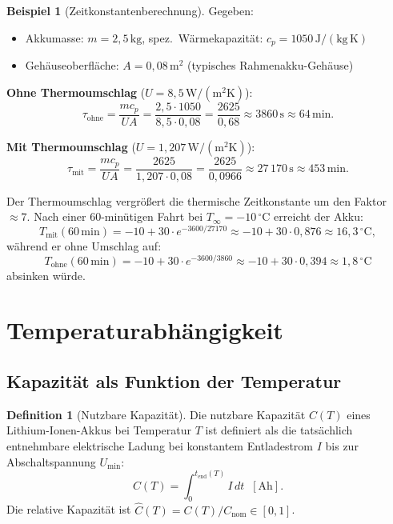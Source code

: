 ﻿\documentclass[a4paper,12pt]{article}
\theoremstyle{definition}
\newtheorem{definition}{Definition}
\newtheorem{beispiel}{Beispiel}
\begin{document}
\begin{beispiel}[Zeitkonstantenberechnung]
Gegeben:
\begin{itemize}
  \item Akkumasse: $m = 2{,}5\,\mathrm{kg}$, spez.\ W\"armekapazit\"at: $c_p = 1050\,\mathrm{J/(kg\,K)}$
  \item Geh\"auseoberfl\"ache: $A = 0{,}08\,\mathrm{m^2}$ (typisches Rahmenakku-Geh\"ause)
\end{itemize}

\textbf{Ohne Thermoumschlag} ($U = 8{,}5\,\mathrm{W/(m^2 K)}$):
\[
  \tau_\mathrm{ohne} = \frac{m c_p}{U A} = \frac{2{,}5 \cdot 1050}{8{,}5 \cdot 0{,}08} = \frac{2625}{0{,}68} \approx 3860\,\mathrm{s} \approx 64\,\mathrm{min}.
\]

\textbf{Mit Thermoumschlag} ($U = 1{,}207\,\mathrm{W/(m^2 K)}$):
\[
  \tau_\mathrm{mit} = \frac{m c_p}{U A} = \frac{2625}{1{,}207 \cdot 0{,}08} = \frac{2625}{0{,}0966} \approx 27\,170\,\mathrm{s} \approx 453\,\mathrm{min}.
\]

Der Thermoumschlag vergr\"o\ss{}ert die thermische Zeitkonstante um den Faktor $\approx 7$. Nach einer 60-min\"utigen Fahrt bei $T_\infty = -10\,{}^\circ\mathrm{C}$ erreicht der Akku:
\[
  T_\mathrm{mit}(60\,\mathrm{min}) = -10 + 30 \cdot e^{-3600/27170} \approx -10 + 30 \cdot 0{,}876 \approx 16{,}3\,{}^\circ\mathrm{C},
\]
w\"ahrend er ohne Umschlag auf:
\[
  T_\mathrm{ohne}(60\,\mathrm{min}) = -10 + 30 \cdot e^{-3600/3860} \approx -10 + 30 \cdot 0{,}394 \approx 1{,}8\,{}^\circ\mathrm{C}
\]
absinken w\"urde.
\end{beispiel}

\section{Temperaturabh\"angigkeit}

\subsection{Kapazit\"at als Funktion der Temperatur}

\begin{definition}[Nutzbare Kapazit\"at]
Die nutzbare Kapazit\"at $C(T)$ eines Lithium-Ionen-Akkus bei Temperatur $T$ ist definiert als die tats\"achlich entnehmbare elektrische Ladung bei konstantem Entladestrom $I$ bis zur Abschaltspannung $U_\mathrm{min}$:
\[
  C(T) = \int_0^{t_\mathrm{end}(T)} I\,dt\;\;[\mathrm{Ah}].
\]
Die relative Kapazit\"at ist $\hat{C}(T) = C(T)/C_\mathrm{nom} \in [0,1]$.
\end{definition}
\end{document}
